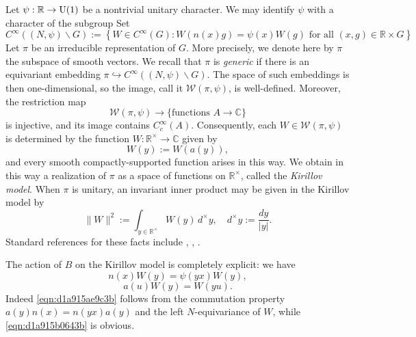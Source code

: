 \documentclass[reqno]{amsart} 
\numberwithin{equation}{section}
\begin{document}
Let $\psi : \mathbb{R} \rightarrow \operatorname{U}(1)$ be a nontrivial unitary character.  We may identify $\psi$ with a character of the subgroup
Set
\begin{equation*}
C^\infty((N,\psi) \backslash G) := \left\{ W \in C^\infty(G): W(n(x) g) = \psi(x) W(g) \text{ for all } (x,g) \in \mathbb{R} \times G \right\}
\end{equation*}
Let $\pi$ be an irreducible representation of $G$.  More precisely, we denote here by $\pi$ the subspace of smooth vectors.  We recall that $\pi$ is \emph{generic} if there is an equivariant embedding $\pi \hookrightarrow C^\infty((N,\psi) \backslash G)$.  The space of such embeddings is then one-dimensional, so the image, call it $\mathcal{W}(\pi,\psi)$, is well-defined.  Moreover, the restriction map
\begin{equation*}
\mathcal{W}(\pi,\psi) \rightarrow \{\text{functions } A \rightarrow \mathbb{C} \}
\end{equation*}
is injective, and its image contains $C_c^\infty(A)$.  Consequently, each $W \in \mathcal{W}(\pi,\psi)$ is determined by the function $W : \mathbb{R}^\times \rightarrow \mathbb{C}$ given by
\begin{equation*}
W(y) := W(a(y)),
\end{equation*}
and every smooth compactly-supported function arises in this way.  We obtain in this way a realization of $\pi$ as a space of functions on $\mathbb{R}^\times$, called the \emph{Kirillov model}.  When $\pi$ is unitary, an invariant inner product may be given in the Kirillov model by
\begin{equation}\label{eqn:d1a915c9af68}
  \lVert W \rVert^2 := \int_{y \in \mathbb{R}^\times } W(y) \, d^\times y, \quad
  d^\times y := \frac{d y}{\lvert y \rvert}.
\end{equation}
Standard references for these facts include \cite[\S6]{MR748505}, \cite[\S10.2]{MR1999922}, \cite{MR2733072}.

The action of $B$ on the Kirillov model is completely explicit: we have
\begin{equation}\label{eqn:d1a915ae9c3b}
n(x) W(y) = \psi(y x) W(y),
\end{equation}
\begin{equation}\label{eqn:d1a915b0643b}
a(u) W(y) = W(y u).
\end{equation}
Indeed \eqref{eqn:d1a915ae9c3b} follows from the commutation property $a(y) n(x) = n(y x) a(y)$ and the left $N$-equivariance of $W$, while \eqref{eqn:d1a915b0643b} is obvious.
\end{document}
